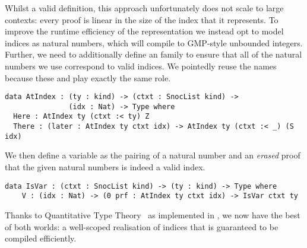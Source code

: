 Whilst a valid definition, this approach unfortunately does not scale to
large contexts:
%
every  proof is linear in the size of the \DeBruijn{}
index that it represents.
%
To improve the runtime efficiency of the representation we instead opt to
model \DeBruijn{} indices as natural numbers, which \Idris{} will compile to
GMP-style unbounded integers.
%
Further, we need to additionally define an  family to ensure that
all of the natural numbers we use correspond to valid indices.
%
We pointedly reuse the  names because these 
and  play exactly the same role.

\begin{Verbatim}
data AtIndex : (ty : kind) -> (ctxt : SnocList kind) ->
               (idx : Nat) -> Type where
  Here : AtIndex ty (ctxt :< ty) Z
  There : (later : AtIndex ty ctxt idx) -> AtIndex ty (ctxt :< _) (S idx)
\end{Verbatim}

\noindent
We then define a variable as the pairing of a natural number and an \emph{erased}
proof that the given natural numbers is indeed a valid \DeBruijn{} index.

\begin{Verbatim}
data IsVar : (ctxt : SnocList kind) -> (ty : kind) -> Type where
    V : (idx : Nat) -> (0 prf : AtIndex ty ctxt idx) -> IsVar ctxt ty
\end{Verbatim}

Thanks to Quantitative Type Theory~\cite{DBLP:conf/birthday/McBride16,DBLP:conf/lics/Atkey18}
as implemented in \Idris{},
we now have the best of both worlds: a well-scoped realisation of \DeBruijn{} indices
that is guaranteed to be compiled efficiently.


